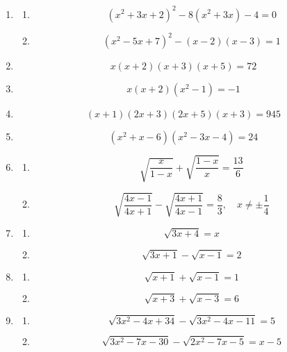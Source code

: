 \documentclass[12pt,a4paper]{article}
\begin{document}
	\begin{enumerate}[label=\textbf{\arabic*.}, leftmargin=1.8em, start=6]
		\item 
		\begin{enumerate}[label=(\roman*), leftmargin=2.2em]
			\item \[(x^{2} + 3x + 2)^{2} - 8(x^{2} + 3x) - 4 = 0\]
			\item \[(x^{2} - 5x + 7)^{2} - (x-2)(x-3) = 1\]
		\end{enumerate}
		
		\item 
		\[x(x+2)(x+3)(x+5) = 72\]
		
		\item 
		\[x(x+2)(x^{2}-1) = -1\]
		
		\item 
		\[(x+1)(2x+3)(2x+5)(x+3) = 945\]
		
		\item 
		\[(x^{2} + x - 6)(x^{2} - 3x - 4) = 24\]
		
		\item 
		\begin{enumerate}[label=(\roman*), leftmargin=2.2em]
			\item \[\sqrt{\frac{x}{1-x}} + \sqrt{\frac{1-x}{x}} = \frac{13}{6}\]
			\item \[\sqrt{\frac{4x-1}{4x+1}} - \sqrt{\frac{4x+1}{4x-1}} = \frac{8}{3},\quad x \neq \pm \frac{1}{4}\]
		\end{enumerate}
		
		\item 
		\begin{enumerate}[label=(\roman*), leftmargin=2.2em]
			\item \[\sqrt{3x+4} = x\]
			\item \[\sqrt{3x+1} - \sqrt{x-1} = 2\]
		\end{enumerate}
		
		\item 
		\begin{enumerate}[label=(\roman*), leftmargin=2.2em]
			\item \[\sqrt{x+1} + \sqrt{x-1} = 1\]
			\item \[\sqrt{x+3} + \sqrt{x-3} = 6\]
		\end{enumerate}
		
		\item 
		\begin{enumerate}[label=(\roman*), leftmargin=2.2em]
			\item \[\sqrt{3x^{2} - 4x + 34} - \sqrt{3x^{2} - 4x - 11} = 5\]
			\item \[\sqrt{3x^{2} - 7x - 30} - \sqrt{2x^{2} - 7x - 5} = x - 5\]
		\end{enumerate}
		

\end{enumerate}
\end{document}
